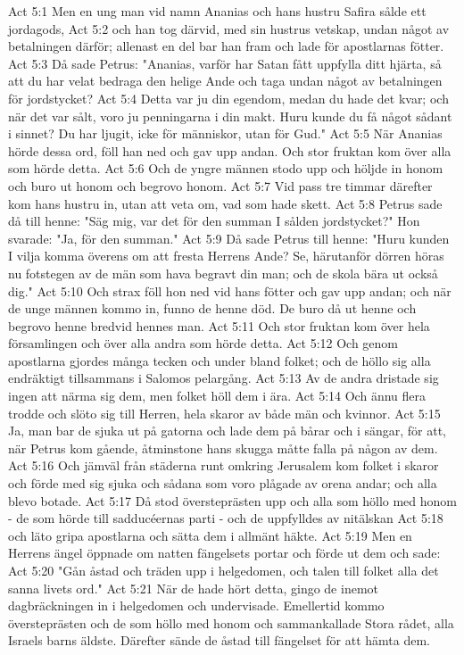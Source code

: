 Act 5:1  Men en ung man vid namn Ananias och hans hustru Safira sålde ett jordagods,
Act 5:2  och han tog därvid, med sin hustrus vetskap, undan något av betalningen därför; allenast en del bar han fram och lade för apostlarnas fötter.
Act 5:3  Då sade Petrus: "Ananias, varför har Satan fått uppfylla ditt hjärta, så att du har velat bedraga den helige Ande och taga undan något av betalningen för jordstycket?
Act 5:4  Detta var ju din egendom, medan du hade det kvar; och när det var sålt, voro ju penningarna i din makt. Huru kunde du få något sådant i sinnet? Du har ljugit, icke för människor, utan för Gud."
Act 5:5  När Ananias hörde dessa ord, föll han ned och gav upp andan. Och stor fruktan kom över alla som hörde detta.
Act 5:6  Och de yngre männen stodo upp och höljde in honom och buro ut honom och begrovo honom.
Act 5:7  Vid pass tre timmar därefter kom hans hustru in, utan att veta om, vad som hade skett.
Act 5:8  Petrus sade då till henne: "Säg mig, var det för den summan I sålden jordstycket?" Hon svarade: "Ja, för den summan."
Act 5:9  Då sade Petrus till henne: "Huru kunden I vilja komma överens om att fresta Herrens Ande? Se, härutanför dörren höras nu fotstegen av de män som hava begravt din man; och de skola bära ut också dig."
Act 5:10  Och strax föll hon ned vid hans fötter och gav upp andan; och när de unge männen kommo in, funno de henne död. De buro då ut henne och begrovo henne bredvid hennes man.
Act 5:11  Och stor fruktan kom över hela församlingen och över alla andra som hörde detta.
Act 5:12  Och genom apostlarna gjordes många tecken och under bland folket; och de höllo sig alla endräktigt tillsammans i Salomos pelargång.
Act 5:13  Av de andra dristade sig ingen att närma sig dem, men folket höll dem i ära.
Act 5:14  Och ännu flera trodde och slöto sig till Herren, hela skaror av både män och kvinnor.
Act 5:15  Ja, man bar de sjuka ut på gatorna och lade dem på bårar och i sängar, för att, när Petrus kom gående, åtminstone hans skugga måtte falla på någon av dem.
Act 5:16  Och jämväl från städerna runt omkring Jerusalem kom folket i skaror och förde med sig sjuka och sådana som voro plågade av orena andar; och alla blevo botade.
Act 5:17  Då stod översteprästen upp och alla som höllo med honom - de som hörde till sadducéernas parti - och de uppfylldes av nitälskan
Act 5:18  och läto gripa apostlarna och sätta dem i allmänt häkte.
Act 5:19  Men en Herrens ängel öppnade om natten fängelsets portar och förde ut dem och sade:
Act 5:20  "Gån åstad och träden upp i helgedomen, och talen till folket alla det sanna livets ord."
Act 5:21  När de hade hört detta, gingo de inemot dagbräckningen in i helgedomen och undervisade. Emellertid kommo översteprästen och de som höllo med honom och sammankallade Stora rådet, alla Israels barns äldste. Därefter sände de åstad till fängelset för att hämta dem.
